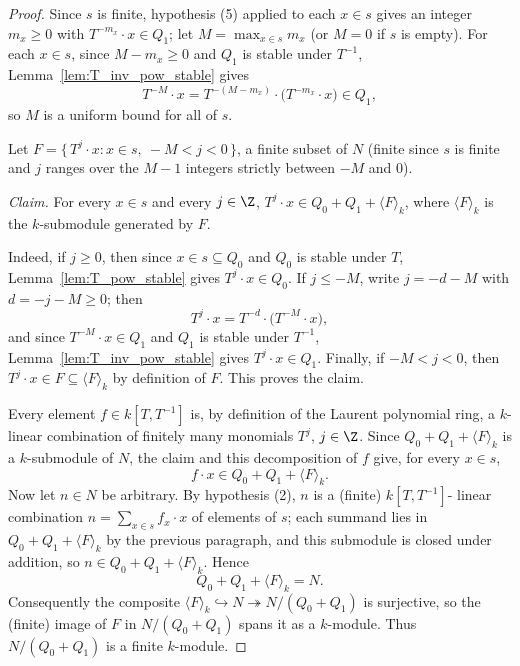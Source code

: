 \begin{proof}
  \leanok
  Since \(s\) is finite, hypothesis (5) applied to each \(x \in s\) gives an integer
  \(m_x \ge 0\) with \(T^{-m_x} \cdot x \in Q_1\); let \(M = \max_{x \in s} m_x\) (or \(M = 0\)
  if \(s\) is empty). For each \(x \in s\), since \(M - m_x \ge 0\) and \(Q_1\) is stable
  under \(T^{-1}\), Lemma~\ref{lem:T_inv_pow_stable} gives
  \[
    T^{-M} \cdot x = T^{-(M - m_x)} \cdot \bigl(T^{-m_x} \cdot x\bigr) \in Q_1 ,
  \]
  so \(M\) is a uniform bound for all of \(s\).

  Let \(F = \{\, T^j \cdot x : x \in s,\ -M < j < 0 \,\}\), a finite subset of \(N\) (finite
  since \(s\) is finite and \(j\) ranges over the \(M - 1\) integers strictly between \(-M\)
  and \(0\)).

  \emph{Claim.} For every \(x \in s\) and every \(j \in \Z\),
  \(T^j \cdot x \in Q_0 + Q_1 + \langle F \rangle_k\), where \(\langle F \rangle_k\) is the
  \(k\)-submodule generated by \(F\).

  Indeed, if \(j \ge 0\), then since \(x \in s \subseteq Q_0\) and \(Q_0\) is stable under
  \(T\), Lemma~\ref{lem:T_pow_stable} gives \(T^j \cdot x \in Q_0\). If \(j \le -M\), write
  \(j = -d - M\) with \(d = -j - M \ge 0\); then
  \[
    T^j \cdot x = T^{-d} \cdot \bigl(T^{-M} \cdot x\bigr) ,
  \]
  and since \(T^{-M} \cdot x \in Q_1\) and \(Q_1\) is stable under \(T^{-1}\),
  Lemma~\ref{lem:T_inv_pow_stable} gives \(T^j \cdot x \in Q_1\). Finally, if \(-M < j < 0\),
  then \(T^j \cdot x \in F \subseteq \langle F \rangle_k\) by definition of \(F\). This proves
  the claim.

  Every element \(f \in k[T,T^{-1}]\) is, by definition of the Laurent polynomial ring, a
  \(k\)-linear combination of finitely many monomials \(T^j\), \(j \in \Z\). Since
  \(Q_0 + Q_1 + \langle F \rangle_k\) is a \(k\)-submodule of \(N\), the claim and this
  decomposition of \(f\) give, for every \(x \in s\),
  \[
    f \cdot x \in Q_0 + Q_1 + \langle F \rangle_k .
  \]
  Now let \(n \in N\) be arbitrary. By hypothesis (2), \(n\) is a (finite) \(k[T,T^{-1}]\)-
  linear combination \(n = \sum_{x \in s} f_x \cdot x\) of elements of \(s\); each summand lies
  in \(Q_0 + Q_1 + \langle F \rangle_k\) by the previous paragraph, and this submodule is
  closed under addition, so \(n \in Q_0 + Q_1 + \langle F \rangle_k\). Hence
  \[
    Q_0 + Q_1 + \langle F \rangle_k = N .
  \]
  Consequently the composite \(\langle F \rangle_k \hookrightarrow N \twoheadrightarrow
  N/(Q_0+Q_1)\) is surjective, so the (finite) image of \(F\) in \(N/(Q_0+Q_1)\) spans it as a
  \(k\)-module. Thus \(N/(Q_0+Q_1)\) is a finite \(k\)-module.
\end{proof}

